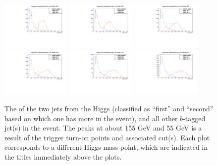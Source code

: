 \begin{figure}[H]
    \includegraphics[width=0.3\textwidth]{SignalKin/jet_pt_compare_bAbb_500.pdf}
    \includegraphics[width=0.3\textwidth]{SignalKin/jet_pt_compare_bAbb_550.pdf}
    \includegraphics[width=0.3\textwidth]{SignalKin/jet_pt_compare_bAbb_600.pdf}
    \newline
    \includegraphics[width=0.3\textwidth]{SignalKin/jet_pt_compare_bAbb_650.pdf}
    \includegraphics[width=0.3\textwidth]{SignalKin/jet_pt_compare_bAbb_700.pdf}
    \includegraphics[width=0.3\textwidth]{SignalKin/jet_pt_compare_bAbb_800.pdf}
    \caption{The \pt of the two jets from the Higgs (classified as ``first'' and ``second'' based
    on which one has more \pt in the event), and all other $b$-tagged jet(s) in the event.
    The peaks at about 155 GeV and 55 GeV is a result of the trigger turn-on points and
    associated cut(s).  Each plot corresponds to a different Higgs mass point, which are 
    indicated in the titles immediately above the plots.\label{fig:pt_higgs_and_associated_jets}}
\end{figure}

